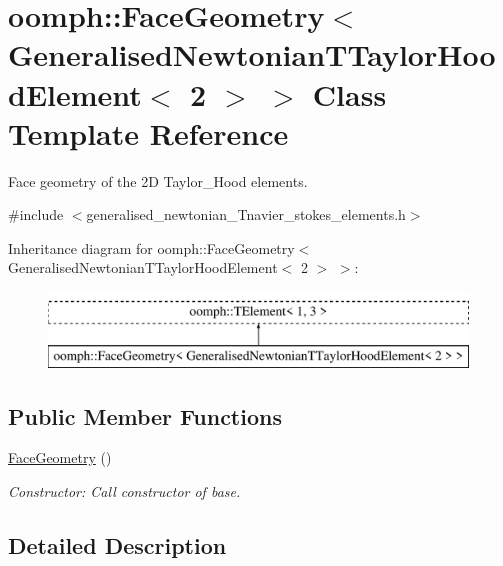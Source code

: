 \hypertarget{classoomph_1_1FaceGeometry_3_01GeneralisedNewtonianTTaylorHoodElement_3_012_01_4_01_4}{}\section{oomph\+:\+:Face\+Geometry$<$ Generalised\+Newtonian\+T\+Taylor\+Hood\+Element$<$ 2 $>$ $>$ Class Template Reference}
\label{classoomph_1_1FaceGeometry_3_01GeneralisedNewtonianTTaylorHoodElement_3_012_01_4_01_4}


Face geometry of the 2D Taylor\+\_\+\+Hood elements.  




{\ttfamily \#include $<$generalised\+\_\+newtonian\+\_\+\+Tnavier\+\_\+stokes\+\_\+elements.\+h$>$}

Inheritance diagram for oomph\+:\+:Face\+Geometry$<$ Generalised\+Newtonian\+T\+Taylor\+Hood\+Element$<$ 2 $>$ $>$\+:\begin{figure}[H]
\begin{center}
\leavevmode
\includegraphics[height=2.000000cm]{classoomph_1_1FaceGeometry_3_01GeneralisedNewtonianTTaylorHoodElement_3_012_01_4_01_4}
\end{center}
\end{figure}
\subsection*{Public Member Functions}
\begin{DoxyCompactItemize}
\item 
\hyperlink{classoomph_1_1FaceGeometry_3_01GeneralisedNewtonianTTaylorHoodElement_3_012_01_4_01_4_ad7a767ffe9c9d06b239ce7416285bffe}{Face\+Geometry} ()
\begin{DoxyCompactList}\small\item\em Constructor\+: Call constructor of base. \end{DoxyCompactList}\end{DoxyCompactItemize}


\subsection{Detailed Description}
